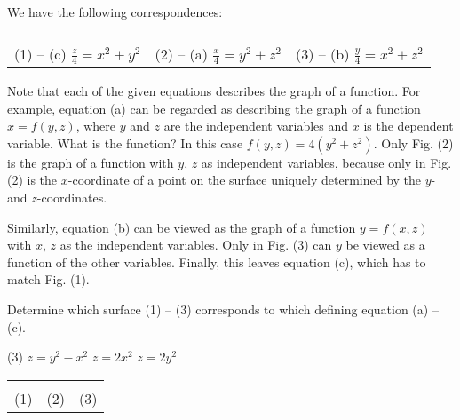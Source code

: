 \begin{solution}
We have the following correspondences:

\begin{center}
\begin{tabu} to \linewidth {X[1,c] X[1,c] X[1,c]}
 &
 &
 \\
(1) -- (c) $\frac z 4 = x^2 + y^2$ & 
(2) -- (a) $\frac x 4 = y^2 + z^2$ & 
(3) -- (b) $\frac y 4 = x^2 + z^2$
\end{tabu}
\end{center}

Note that each of the given equations describes the graph of a function. For example, equation (a) can be regarded as describing the graph of a function $x = f(y,z)$, where $y$ and $z$ are the independent variables and $x$ is the dependent variable. What is the function? In this case $f(y,z) = 4(y^2 + z^2)$. Only Fig. (2) is the graph of a function with $y$, $z$ as independent variables, because only in Fig. (2) is the $x$-coordinate of a point on the surface uniquely determined by the $y$- and $z$-coordinates.

Similarly, equation (b) can be viewed as the graph of a function $y = f(x,z)$ with $x$, $z$ as the independent variables. Only in Fig. (3) can $y$ be viewed as a function of the other variables. Finally, this leaves equation (c), which has to match Fig. (1).
\end{solution}

\begin{question}
Determine which surface (1) -- (3) corresponds to which defining equation (a) -- (c).
\begin{tasks}(3)
\task
$z = y^2-x^2$
\task
$z = 2x^2$
\task
$z = 2y^2$
\end{tasks}

\begin{center}
\begin{tabu} to \linewidth {X[1,c] X[1,c] X[1,c]}
 &
 &
 \\
(1) & 
(2) & 
(3)
\end{tabu}
\end{center}
\end{question}

